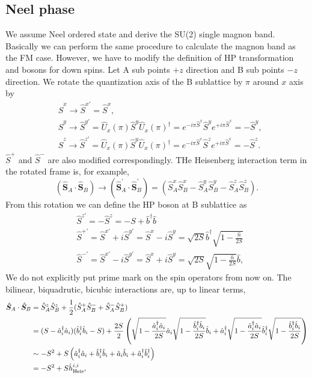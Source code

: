 \documentclass[11pt, aps, longbibliography]{article}
\begin{document}
\subsection{Neel phase}
We assume Neel ordered state and derive the SU(2) single magnon band.
Basically we can perform the same procedure to calculate the magnon band as the FM case.
However, we have to modify the definition of HP transformation and bosons for down spins.
Let A sub points $+z$ direction and B sub points $-z$ direction. We rotate the quantization axis of the B sublattice by $\pi$ around $x$ axis by
\begin{align}
    &\hat{S}^x \rightarrow \hat{S}^{x\prime} = \hat{S}^x, \\ 
    &\hat{S}^y \rightarrow \hat{S}^{y\prime} =\hat{U}_x(\pi) \hat{S}^y \hat{U}_x(\pi)^\dagger = e^{-i\pi \hat{S}^x}\hat{S}^ye^{+i\pi \hat{S}^x} = -\hat{S}^y,  \\
    &\hat{S}^z \rightarrow \hat{S}^{z\prime} =\hat{U}_x(\pi) \hat{S}^y \hat{U}_x(\pi)^\dagger = e^{-i\pi \hat{S}^x}\hat{S}^ze^{+i\pi \hat{S}^x} = -\hat{S}^z. 
\end{align}
$\hat{S}^+$ and $\hat{S}^-$ are also modified correspondingly. 
THe Heisenberg interaction term in the rotated frame is, for example, 
\begin{equation}
    (\hat{\bm{S}}_A\cdot \hat{\bm{S}}_B) \rightarrow (\hat{\bm{S}}_A^{\prime}\cdot \hat{\bm{S}}_B^{\prime}) = (\hat{S}_A^x\hat{S}_B^x - \hat{S}_A^y\hat{S}_B^y - \hat{S}_A^z\hat{S}_B^z).
\end{equation}
From this rotation we can define the HP boson at B sublattice as
\begin{align}
    &\hat{S}^{z\prime} = -\hat{S}^{z} = -S + \hat{b}^\dagger\hat{b} \\
    &\hat{S}^{+\prime} = \hat{S}^{x\prime} + i\hat{S}^{y\prime} = \hat{S}^{x} -i\hat{S}^{y} = \sqrt{2S} \hat{b}^{\dagger} \sqrt{1-\frac{\hat{n}}{2S}} \\
    &\hat{S}^{-\prime} = \hat{S}^{x\prime} - i\hat{S}^{y\prime} = \hat{S}^x + i\hat{S}^y = \sqrt{2S} \sqrt{1-\frac{\hat{n}}{2S}} \hat{b}, 
\end{align}
We do not explicitly put prime mark on the spin operators from now on. 
The bilinear, biquadrutic, bicubic interactions are, up to linear terms,
\begin{align}
    \hat{\bm{S}}_A \cdot \hat{\bm{S}}_B &= \hat{S}_A^z \hat{S}_B^z + \frac{1}{2} (\hat{S}^+_A \hat{S}^-_B + \hat{S}^-_A \hat{S}^+_B) \notag \\
    &= (S-\hat{a}^\dagger_i \hat{a}_i)(\hat{b}^\dagger_i \hat{b}_i-S) + \frac{2S}{2} \left( \sqrt{1-\frac{\hat{a}^\dagger_i \hat{a}_i}{2S}} \hat{a}_i \sqrt{1-\frac{\hat{b}^\dagger_i \hat{b}_i}{2S}} \hat{b}_i  + \hat{a}^{\dagger}_i \sqrt{1-\frac{\hat{a}^\dagger_i \hat{a}_i}{2S}}    \hat{b}^{\dagger}_i \sqrt{1-\frac{\hat{b}^\dagger_i \hat{b}_i}{2S}} \right) \notag \\
    &\sim -S^2 + S\left( \hat{a}^\dagger_i \hat{a}_i + \hat{b}^\dagger_i \hat{b}_i + \hat{a}_i \hat{b}_i + \hat{a}^\dagger_i \hat{b}_i^{\dagger} \right)  \notag\\
    &= -S^2 + S\hat{h}_{\rm Heis}^{i,i},
\end{align}
\end{document}
